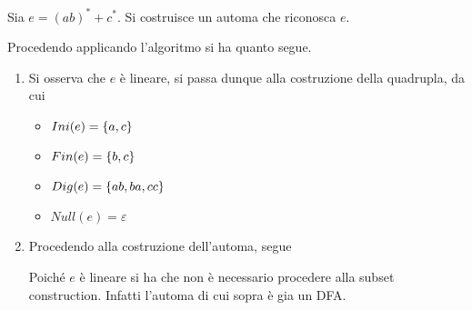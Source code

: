 \documentclass{subfiles}
\begin{document}
\begin{Example*}
    Sia \(e = (ab)^{*} + c^{*}\). Si costruisce un automa che riconosca \(e\).

    \begin{Solution*}
        Procedendo applicando l'algoritmo si ha quanto segue.
        \begin{enumerate}
            \item Si osserva che \(e\) è lineare, si passa dunque alla costruzione della quadrupla, da cui
                  \begin{multicols}{2}
                      \begin{itemize}
                          \item \(Ini(e) = \left\{a, c\right\}\)
                          \item \(Fin(e) = \left\{b, c\right\}\)
                          \item \(Dig(e) = \left\{ab, ba, cc\right\}\)
                          \item \(Null(e) = \varepsilon\)
                      \end{itemize}
                  \end{multicols}

            \item Procedendo alla costruzione dell'automa, segue
                  

                  \begin{Remark*}
                      Poiché \(e\) è lineare si ha che non è necessario procedere alla subset construction.
                      Infatti l'automa di cui sopra è gia un DFA.
                  \end{Remark*}
        \end{enumerate}
    \end{Solution*}
\end{Example*}
\clearpage
\end{document}
